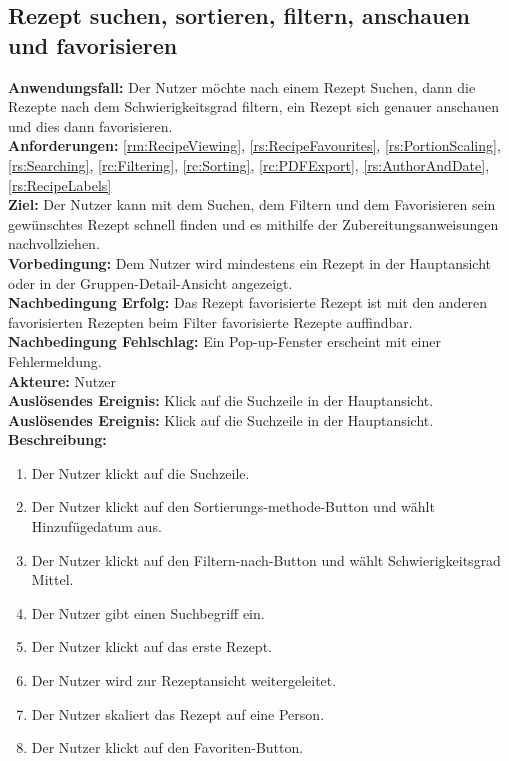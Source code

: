 \documentclass[parskip=full]{scrartcl}
\begin{document}
\subsection{Rezept suchen, sortieren, filtern, anschauen und favorisieren}
\textbf{Anwendungsfall:} Der Nutzer möchte nach einem Rezept Suchen, dann die Rezepte nach dem Schwierigkeitsgrad filtern, ein Rezept sich genauer anschauen und dies dann favorisieren.\\
\textbf{Anforderungen:} \ref{rm:RecipeViewing}, \ref{rs:RecipeFavourites}, \ref{rs:PortionScaling}, \ref{rs:Searching}, \ref{rc:Filtering}, \ref{rc:Sorting}, \ref{rc:PDFExport}, \ref{rs:AuthorAndDate}, \ref{rs:RecipeLabels}\\
\textbf{Ziel:} Der Nutzer kann mit dem Suchen, dem Filtern und dem Favorisieren sein gewünschtes Rezept schnell finden und es mithilfe der Zubereitungsanweisungen nachvollziehen.\\
\textbf{Vorbedingung:} Dem Nutzer wird mindestens ein Rezept in der Hauptansicht oder in der Gruppen-Detail-Ansicht angezeigt.\\
\textbf{Nachbedingung Erfolg:} Das Rezept favorisierte Rezept ist mit den anderen favorisierten Rezepten beim Filter favorisierte Rezepte auffindbar.\\
\textbf{Nachbedingung Fehlschlag:} Ein Pop-up-Fenster erscheint mit einer Fehlermeldung.\\
\textbf{Akteure:} Nutzer\\
\textbf{Auslösendes Ereignis:} Klick auf die Suchzeile in der Hauptansicht.\\
\textbf{Auslösendes Ereignis:} Klick auf die Suchzeile in der Hauptansicht.\\
\textbf{Beschreibung:}
\begin{enumerate}
    \item Der Nutzer klickt auf die Suchzeile.
    \item Der Nutzer klickt auf den Sortierungs-methode-Button und wählt Hinzufügedatum aus.
    \item Der Nutzer klickt auf den Filtern-nach-Button und wählt Schwierigkeitsgrad Mittel.
    \item Der Nutzer gibt einen Suchbegriff ein.
    \item Der Nutzer klickt auf das erste Rezept.
    \item Der Nutzer wird zur Rezeptansicht weitergeleitet.
    \item Der Nutzer skaliert das Rezept auf eine Person.
    \item Der Nutzer klickt auf den Favoriten-Button.
\end{enumerate}
\end{document}
